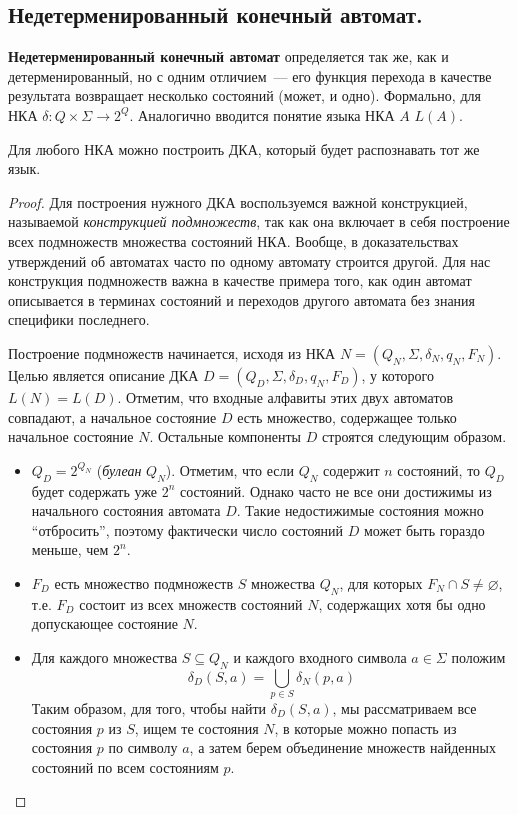 \documentclass[a4paper,12pt]{article}
\begin{document}
	\subsection{Недетерменированный конечный автомат.}
	\textbf{Недетерменированный конечный автомат} определяется так же, как и детерменированный, но с одним отличием~--- его функция перехода в качестве результата возвращает несколько состояний (может, и одно). Формально, для НКА $\delta : Q \times \Sigma \to 2^{Q}$. Аналогично вводится понятие языка НКА $A$ $L(A)$.
	
	\begin{theorem}
		Для любого НКА можно построить ДКА, который будет распознавать тот же язык.
	\end{theorem}
	\begin{proof}
		Для построения нужного ДКА воспользуемся важной конструкцией, называемой \textit{конструкцией подмножеств}, так как она включает в себя построение всех подмножеств множества состояний НКА. Вообще, в доказательствах утверждений об автоматах часто по одному автомату строится другой. Для нас конструкция подмножеств важна в качестве примера того, как один автомат описывается в терминах состояний и переходов другого автомата без знания специфики последнего.
		
		Построение подмножеств начинается, исходя из НКА $N = (Q_N, \Sigma, \delta_N, q_N, F_N)$. Целью является описание ДКА $D = (Q_D, \Sigma, \delta_D, {q_N}, F_D)$, у которого $L(N) = L(D)$. Отметим, что входные алфавиты этих двух автоматов совпадают, а начальное состояние $D$ есть множество, содержащее только начальное состояние $N$. Остальные компоненты $D$ строятся следующим образом.
		\begin{itemize}
			\item $Q_D = 2^{Q_N}$ (\textit{булеан} $Q_N$). Отметим, что если $Q_N$ содержит $n$ состояний, то $Q_D$ будет содержать уже $2^n$ состояний. Однако часто не все они достижимы из начального состояния автомата $D$. Такие недостижимые состояния можно ``отбросить'', поэтому фактически число состояний $D$ может быть гораздо меньше, чем $2^n$.
			\item $F_D$ есть множество подмножеств $S$ множества $Q_N$, для которых $F_N \cap S \neq \varnothing$, т.е. $F_D$ состоит из всех множеств состояний $N$, содержащих хотя бы одно допускающее состояние $N$.
			\item Для каждого множества $S \subseteq Q_N$ и каждого входного символа $a \in \Sigma$ положим
			\[\delta_D(S, a) = \bigcup_{p \in S} \delta_N(p, a)\]
			Таким образом, для того, чтобы найти $\delta_D(S, a)$, мы рассматриваем все состояния $p$ из $S$, ищем те состояния $N$, в которые можно попасть из состояния $p$ по символу $a$, а затем берем объединение множеств найденных состояний по всем состояниям $p$.
		\end{itemize}
		

\end{proof}
\end{document}

